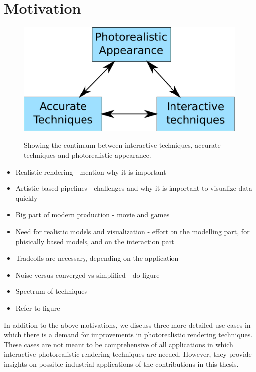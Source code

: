 \section{Motivation}

\begin{figure}
\centering
	 \includegraphics[width=\textwidth]{figures/main_diagram}  \\
\caption{Showing the continuum between interactive techniques, accurate techniques and photorealistic appearance.} 
\label{fig:main_diagram}
\end{figure}

\begin{itemize}
\item Realistic rendering - mention why it is important
\item Artistic based pipelines - challenges and why it is important to visualize data quickly
\item Big part of modern production - movie and games
\item Need for realistic models and visualization - effort on the modelling part, for phisically based models, and on the interaction part 
\item Tradeoffs are necessary, depending on the application
\item Noise versus converged vs simplified - do figure 
\item Spectrum of techniques
\item Refer to figure
\end{itemize}

In addition to the above motivations, we discuss three more detailed use cases in which there is a demand for improvements in photorealistic rendering techniques. These cases are not meant to be comprehensive of all applications in which interactive photorealistic rendering techniques are needed. However, they provide insights on possible industrial applications of the contributions in this thesis.

